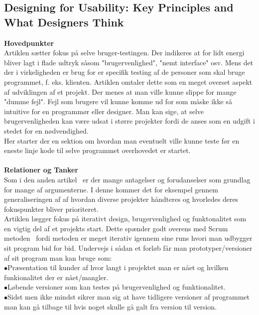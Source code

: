 \documentclass[a4paper]{article}
\begin{document}
\subsection{Designing for Usability: Key Principles and What Designers Think}
\textbf{Hovedpunkter}\\
Artiklen sætter fokus på selve bruger-testingen. Der indikeres at for lidt energi bliver lagt i flade udtryk såsom "brugervenlighed", "nemt interface" osv. Mens det der i virkeligheden er brug for er specifik testing af de personer som skal bruge programmet, f. eks. klienten. Artiklen omtaler dette som en meget overset aspekt af udviklingen af et projekt. Der menes at man ville kunne slippe for mange "dumme fejl". Fejl som brugere vil kunne komme ud for som måske ikke så intuitive for en programmør eller designer. Man kan sige, at selve brugervenligheden kan være udsat i større projekter fordi de anses som en udgift i stedet for en nødvendighed.\\
Her starter der en sektion om hvordan man eventuelt ville kunne teste før en eneste linje kode til selve programmet overhovedet er startet.\\\\
\textbf{Relationer og Tanker}\\
Som i den anden artikel~\cite{UseDesign} er der mange antagelser og forudanselser som grundlag for mange af argumenterne. I denne kommer det for eksempel gennem generaliseringen af af hvordan diverse projekter håndteres og hvorledes deres fokuspunkter bliver prioriteret.\\
Artiklen lægger fokus på iterativt design, brugervenlighed og funktonalitet som en vigtig del af et projekts start. Dette spænder godt overens med Scrum metoden~\cite{Scrum} fordi metoden er meget iterativ igennem sine runs hvori man udbygger sit program bid for bid. Undervejs i sådan et forløb får man prototyper/versioner af sit program man kan bruge som:\\
$\bullet$Præsentation til kunder af hvor langt i projektet man er nået og hvilken funkionalitet der er nået/mangler.\\
$\bullet$Løbende versioner som kan testes på brugervenlighed og funktionalitet.\\
$\bullet$Sidst men ikke mindst sikrer man sig at have tidligere versioner af programmet man kan gå tilbage til hvis noget skulle gå galt fra version til version.\\
\pagebreak
{}

\end{document}
